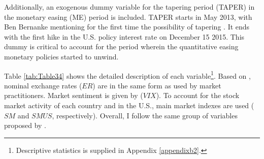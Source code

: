 \documentclass[a4paper, twoside]{templates/ociamthesis}
\begin{document}
Additionally, an exogenous dummy variable for the tapering period (TAPER) in the monetary easing (ME) period is included. TAPER starts in May 2013, with Ben Bernanke mentioning for the first time the possibility of tapering \autocite{chari2017}. It ends with the first hike in the U.S. policy interest rate on December 15 2015. This dummy is critical to account for the period wherein the quantitative easing monetary policies started to unwind.

Table \ref{tab:Table34} shows the detailed description of each variable\footnote{Descriptive statistics is supplied in Appendix \ref{appendixb2}.}. Based on \textcite{donnelly2019}, nominal exchange rates (\(ER\)) are in the same form as used by market practitioners. Market sentiment is given by (\(VIX\)). To account for the stock market activity of each country and in the U.S., main market indexes are used (\(SM\) and \(SMUS\), respectively). Overall, I follow the same group of variables proposed by \textcite{nishigaki2007}.
\end{document}

